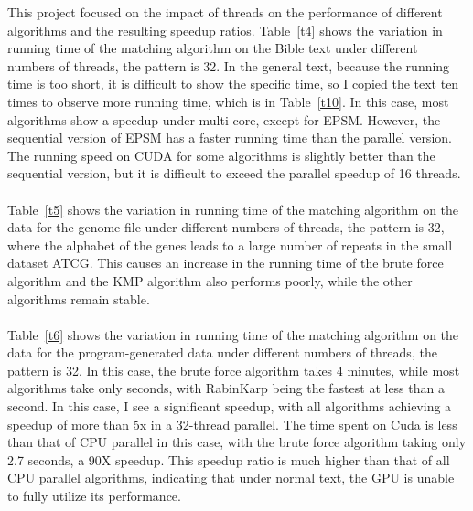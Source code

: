 \documentclass[11pt]{article}       %
\begin{document}
This project focused on the impact of threads on the performance of different algorithms and the resulting speedup ratios. Table~\ref{t4} shows the variation in running time of the matching algorithm on the Bible text under different numbers of threads, the pattern is 32. In the general text, because the running time is too short, it is difficult to show the specific time, so I copied the text ten times to observe more running time, which is in Table~\ref{t10}. In this case, most algorithms show a speedup under multi-core, except for EPSM. However, the sequential version of EPSM has a faster running time than the parallel version. The running speed on CUDA for some algorithms is slightly better than the sequential version, but it is difficult to exceed the parallel speedup of 16 threads.\\
\\Table~\ref{t5} shows the variation in running time of the matching algorithm on the data for the genome file under different numbers of threads, the pattern is 32, where the alphabet of the genes leads to a large number of repeats in the small dataset {ATCG}. This causes an increase in the running time of the brute force algorithm and the KMP algorithm also performs poorly, while the other algorithms remain stable. \\
\\Table~\ref{t6} shows the variation in running time of the matching algorithm on the data for the program-generated data under different numbers of threads, the pattern is 32. In this case, the brute force algorithm takes 4 minutes, while most algorithms take only seconds, with RabinKarp being the fastest at less than a second. In this case, I see a significant speedup, with all algorithms achieving a speedup of more than 5x in a 32-thread parallel. The time spent on Cuda is less than that of CPU parallel in this case, with the brute force algorithm taking only 2.7 seconds, a 90X speedup. This speedup ratio is much higher than that of all CPU parallel algorithms, indicating that under normal text, the GPU is unable to fully utilize its performance.
\end{document}

